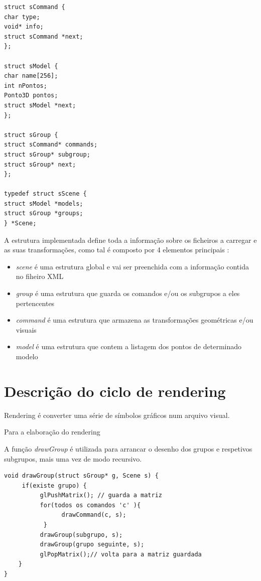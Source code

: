\begin{Verbatim}
struct sCommand {
char type;
void* info;
struct sCommand *next;
};

struct sModel {
char name[256];
int nPontos;
Ponto3D pontos;
struct sModel *next;
};

struct sGroup {
struct sCommand* commands;
struct sGroup* subgroup;
struct sGroup* next;
};

typedef struct sScene {
struct sModel *models;
struct sGroup *groups;
} *Scene;
\end{Verbatim}

A estrutura implementada define toda a informação sobre os ficheiros a carregar e as suas transformações, como tal é composto por 4 elementos principais :

\begin{itemize}
	\item \textit{scene} é uma estrutura global e vai ser preenchida com a informação contida no fiheiro XML
	\item \textit{group} é uma estrutura que guarda os comandos e/ou os subgrupos a eles pertencentes 
	\item \textit{command} é uma estrutura que armazena as transformações geométricas e/ou visuais
	\item \textit{model} é uma estrutura que contem a listagem dos pontos de determinado modelo
\end{itemize}




\section{ Descrição do ciclo de rendering}

Rendering é converter uma série de símbolos gráficos num arquivo visual. 

Para a elaboração do rendering 


A função \textit{drawGroup} é utilizada para arrancar o desenho dos grupos e respetivos subgrupos, mais uma vez de modo recursivo. 
\begin{Verbatim}
void drawGroup(struct sGroup* g, Scene s) {
     if(existe grupo) {
          glPushMatrix(); // guarda a matriz
          for(todos os comandos 'c' ){
                drawCommand(c, s);
           }
          drawGroup(subgrupo, s);
          drawGroup(grupo seguinte, s);
          glPopMatrix();// volta para a matriz guardada
    }
}
\end{Verbatim}


